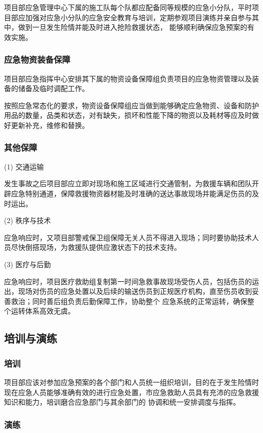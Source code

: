 项目部应急管理中心下属的施工队每个队都应配备同等规模的应急小分队，平时项目部应加强对应急小分队的应急安全教育与培训，定期参观项目演练并亲自参与其中，做到一旦发生险情并能及时进入抢险救援状态，
能够顺利确保应急预案的有效实施。

\subsubsection{应急物资装备保障}

项目部应急指挥中心安排其下属的物资设备保障组负责项目的应急物资管理以及装备的储备及临时调配工作。

按照应急常态化的要求，物资设备保障组应当做到能够确定应急物资、设备和防护用品的数量，品类和状态，对有缺失，损坏和性能下降的物资以及耗材等应及时做好更新补充，维修和替换。

\subsubsection{其他保障}

(1) 交通运输

发生事故之后项目部应立即对现场和施工区域进行交通管制，为救援车辆和团队开辟应急特别通道，保障救援物资器材能及时准确的送达事故现场并能满足伤员的及时运出。

(2) 秩序与技术

应急响应时，又项目部警戒保卫组保障无关人员不得进入现场；同时要协助技术人员尽快倒搭现场，为救援队提供应激状态下的技术支持。

(3) 医疗与后勤

应急响应时，项目医疗救助组复制第一时间急救事故现场受伤人员，包括伤员的运出，现场对伤员的应急处置以及后续的输送伤员到正规医疗机构，直至伤员收到妥善救治；同时善后组负责后勤保障工作，协助整个
应急系统的正常运转，确保整个运转体系高效无虞。

\subsection{培训与演练}
\subsubsection{培训}

项目部应该对参加应急预案的各个部门和人员统一组织培训，目的在于发生险情时现在应急人员能够准确有效的进行应急处置，市应急救助人员具有充沛的应急救援知识和能力，培训磨合应急部门与其余部门的
协调和统一安排调度与指挥。

\subsubsection{演练}

